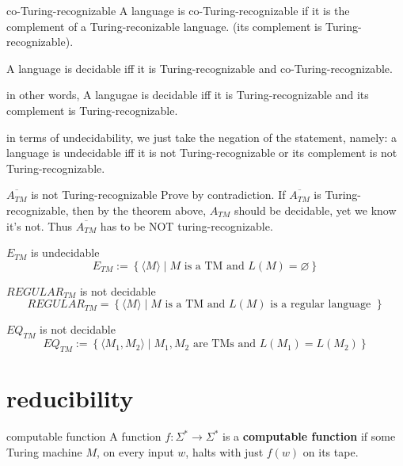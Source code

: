 \documentclass[a4paper]{article}
\begin{document}
\begin{Definition}{co-Turing-recognizable}{}
	A language is co-Turing-recognizable if it is the complement of a Turing-reconizable language. (its complement is Turing-recognizable).
\end{Definition}

\begin{Theorem}{}{}
	A language is decidable iff it is Turing-recognizable and co-Turing-recognizable.
\end{Theorem}
	in other words, A langugae is decidable iff it is Turing-recognizable and its complement is Turing-recognizable.

	in terms of undecidability, we just take the negation of the statement, namely: a language is undecidable iff it is not Turing-recognizable or its complement is not Turing-recognizable.

	\begin{Corollary}{$\overline{A_{TM}}$ is not Turing-recognizable}{}
	Prove by contradiction. If $\overline{A_{TM}}$ is Turing-recognizable, then by the theorem above, $A_{TM}$ should be decidable, yet we know it's not. Thus $\overline{A_{TM}}$ has to be NOT turing-recognizable.
\end{Corollary}

\begin{Theorem}{$E_{TM}$ is undecidable}{}
	\[
		E_{TM} := \left\{ \langle M \rangle \mid M \text{ is a TM and } L(M) = \varnothing  \right\} 
	\] 
\end{Theorem}

\begin{Theorem}{$REGULAR_{TM}$ is not decidable}{}
	\[
		REGULAR_{TM} = \left\{ \langle M \rangle \mid M \text{ is a TM and } L(M) \text{ is a regular language } \right\} 
	\] 
\end{Theorem}

\begin{Theorem}{$EQ_{TM}$ is not decidable}{}
	\[
		EQ_{TM} := \left\{ \langle M_1, M_2 \rangle \mid M_1, M_2 \text{ are TMs and } L(M_1) = L(M_2)  \right\} 
	\] 
\end{Theorem}

\newpage

\newpage
\section{reducibility}

\begin{Definition}{computable function}{}
	A function $f: \Sigma^* \to \Sigma^*$ is a \textbf{computable function} if some Turing machine $M$, on every input  $w$, halts with just  $f(w)$ on its tape. 
\end{Definition}
\end{document}
